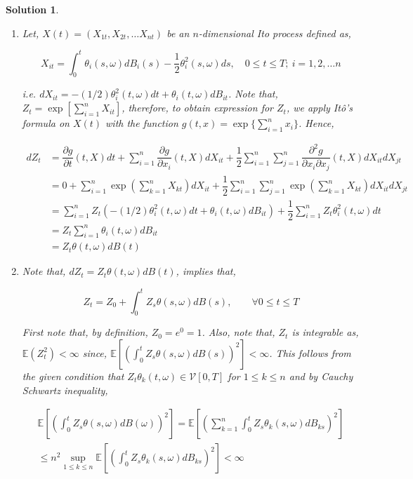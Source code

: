 \documentclass[12pt]{article}
\theoremstyle{problemstyle}
\newtheorem*{solution*}{Solution}
\newcommand{\E}{\mathbb{E}}
\begin{document}
\begin{solution*}

\begin{enumerate}
    \item[(a)] Let, $X(t) = (X_{1t}, X_{2t}, \dots X_{nt})$ be an $n$-dimensional Ito process defined as,

$$
X_{it} = \int_0^t \theta_i(s, \omega) dB_i(s) - \dfrac{1}{2} \theta_i^2(s, \omega) ds, \quad 0 \leq t \leq T; \ i = 1, 2, \dots n
$$

i.e. $dX_{it} = -(1/2) \theta_i^2(t, \omega)dt + \theta_i(t, \omega) dB_{it}$. Note that, $Z_t = \exp\left[ \sum_{i=1}^n X_{it} \right]$, therefore, to obtain expression for $Z_t$, we apply It\^o's formula on $X(t)$ with the function $g(t, x) = \exp\{ \sum_{i=1}^n x_i \}$. Hence,

\begin{align*}
    dZ_t
    & = \dfrac{\partial g}{\partial t}(t, X)dt + \sum_{i=1}^n \dfrac{\partial g}{\partial x_i}(t, X) dX_{it} + \dfrac{1}{2}\sum_{i=1}^n\sum_{j=1}^n \dfrac{\partial^2 g}{\partial x_i \partial x_j}(t, X) dX_{it} dX_{jt}\\
    & = 0 + \sum_{i=1}^n \exp\left( \sum_{k=1}^n X_{kt} \right) dX_{it} + \dfrac{1}{2}\sum_{i=1}^n\sum_{j=1}^n \exp\left( \sum_{k=1}^n X_{kt} \right) dX_{it} dX_{jt}\\
    & = \sum_{i=1}^n Z_t \left( -(1/2) \theta_i^2(t, \omega)dt + \theta_i(t, \omega) dB_{it} \right) + \dfrac{1}{2} \sum_{i=1}^n Z_t \theta_i^2(t, \omega)dt\\
    & = Z_t \sum_{i=1}^n \theta_i(t, \omega) dB_{it}\\
    & = Z_t \theta(t, \omega) dB(t)
\end{align*}


\item[(b)] Note that, $dZ_t = Z_t \theta(t, \omega) dB(t)$, implies that, 

$$
Z_t = Z_0 + \int_0^t Z_s \theta(s, \omega) dB(s), \qquad \forall 0 \leq t \leq T
$$

First note that, by definition, $Z_0 = e^0 = 1$. Also, note that, $Z_t$ is integrable as, $\E(Z_t^2) < \infty$ since, $\E\left[ \left(\int_0^t Z_s \theta(s, \omega) dB(s)\right)^2 \right] < \infty$. This follows from the given condition that $Z_t \theta_k(t, \omega) \in \mathcal{V}[0, T]$ for $1 \leq k \leq n$ and by Cauchy Schwartz inequality,

\begin{multline*}
\E\left[ \left(\int_0^t Z_s \theta(s, \omega) dB(\omega)\right)^2 \right] = \E\left[ \left(\sum_{k=1}^n \int_0^t Z_s \theta_k(s, \omega) dB_{ks}\right)^2 \right] \\
\leq n^2 \sup_{1 \leq k \leq n} \E\left[ \left(\int_0^t Z_s \theta_k(s, \omega) dB_{ks}\right)^2 \right] < \infty
\end{multline*}



\end{enumerate}
\end{solution*}
\end{document}
